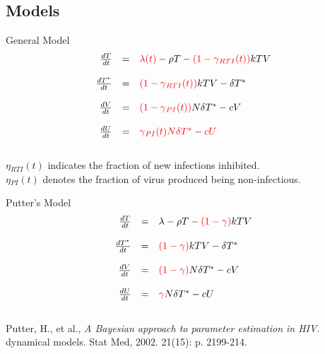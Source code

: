 \documentclass[9pt]{beamer}
\begin{document}
\subsection[Models]{Models}
\begin{frame}{General Model}
\begin{equation}
\begin{array}{rcl}
\frac{dT}{dt} & = & {\color{red}\lambda{}(t)}-\rho{}T-{\color{red}(1-\gamma{}_{RTI}(t))}kTV \\ \\
\frac{dT^{*}}{dt} & = & {\color{red}(1-\gamma{}_{RTI}(t))}kTV-\delta{}T^{*} \\ \\
\frac{dV}{dt} & = & {\color{red}(1-\gamma{}_{PI}(t))}N\delta{}T^{*}-cV \\ \\
\frac{dU}{dt} & = & {\color{red}\gamma{}_{PI}(t)N\delta{}T^{*}-cU} \label{generalmodel}
\end{array}
\end{equation}
\\
$\eta{}_{RTI}(t)$ indicates the fraction of new infections inhibited. \\
$\eta{}_{PI}(t)$ denotes the fraction of virus produced being non-infectious. 
\end{frame}

\begin{frame}{Putter's Model}
\begin{equation}
\begin{array}{rcl}
\frac{dT}{dt} & = & \lambda{}-\rho{}T-{\color{red}(1-\gamma{})}kTV \\ \\
\frac{dT^{*}}{dt} & = & {\color{red}(1-\gamma{})}kTV-\delta{}T^{*} \\ \\
\frac{dV}{dt} & = & {\color{red}(1-\gamma{})}N\delta{}T^{*}-cV \\ \\
\frac{dU}{dt} & = & {\color{red}\gamma{}}N\delta{}T^{*}-cU \label{Puttermodel}
\end{array}
\end{equation}
\\
Putter, H., et al., 
\emph{A Bayesian approach to parameter estimation in HIV}. 
dynamical models. Stat Med, 2002. 21(15): p. 2199-214.
\end{frame}
\end{document}
